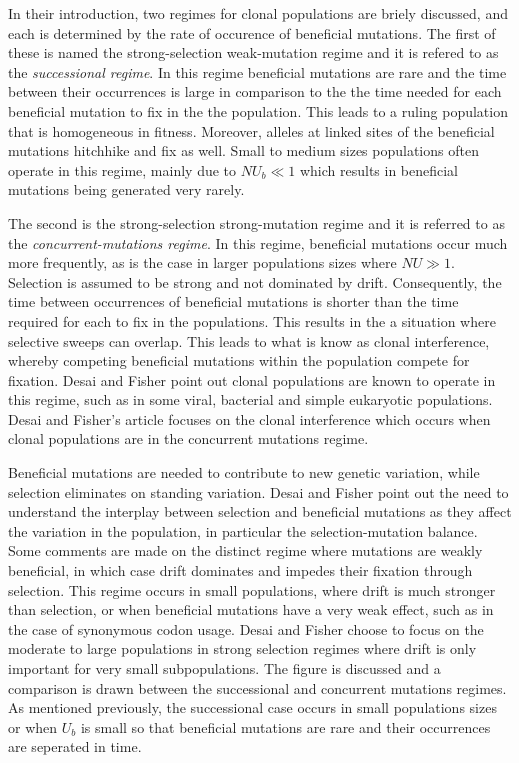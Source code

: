 \documentclass[12pt,twocolumn]{article}
\begin{document}
In their introduction, two regimes for clonal populations are briely discussed, and each is determined by the rate of occurence of beneficial mutations.  The first of these is named the strong-selection weak-mutation regime and it is refered to as the \textit{successional regime}.  In this regime beneficial mutations are rare and the time between their occurrences is large in comparison to the the time needed for each beneficial mutation to fix in the the population.  This leads to a ruling population that is homogeneous in fitness. Moreover, alleles at linked sites of the beneficial mutations hitchhike and fix as well.  Small to medium sizes populations often operate in this regime, mainly due to $NU_b \ll 1$ which results in beneficial mutations being generated very rarely. 

The second is the strong-selection strong-mutation regime and it is referred to as the \textit{concurrent-mutations regime}. In this regime, beneficial mutations occur much more frequently, as is the case in larger populations sizes where $NU \gg 1$.  Selection is assumed to be strong and not dominated by drift.  Consequently, the time between occurrences of beneficial mutations is shorter than the time required for each to fix in the populations.  This results in the a situation where selective sweeps can overlap. This leads to what is know as clonal interference, whereby competing beneficial mutations within the population compete for fixation. Desai and Fisher point out clonal populations are known to operate in this regime, such as in some viral, bacterial and simple eukaryotic populations.  Desai and Fisher's article focuses on the clonal interference which occurs when clonal populations are in the concurrent mutations regime.  

Beneficial mutations are needed to contribute to new genetic variation, while selection eliminates on standing variation.  Desai and Fisher point out the need to understand the interplay between selection and beneficial mutations as they affect the variation in the population, in particular the selection-mutation balance.  Some comments are made on the distinct regime where mutations are weakly beneficial, in which case drift dominates and impedes their fixation through selection.  This regime occurs in small populations, where drift is much stronger than selection, or when beneficial mutations have a very weak effect, such as in the case of synonymous codon usage.  Desai and Fisher choose to focus on the moderate to large populations in strong selection regimes where drift is only important for very small subpopulations.  The figure is discussed and a comparison is drawn between the successional and concurrent mutations regimes.  As mentioned previously, the successional case occurs in small populations sizes or when $U_b$ is small so that beneficial mutations are rare and their occurrences are seperated in time.
\end{document}
